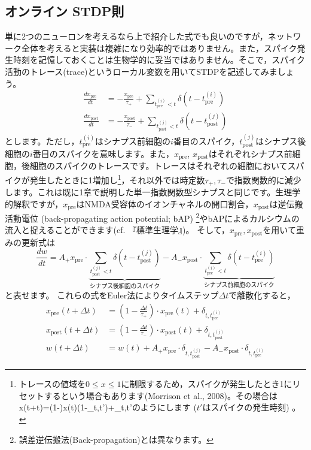 \subsection{オンライン STDP則}
単に2つのニューロンを考えるなら上で紹介した式でも良いのですが，ネットワーク全体を考えると実装は複雑になり効率的ではありません。また，スパイク発生時刻を記憶しておくことは生物学的に妥当ではありません。そこで，スパイク活動のトレース(trace)というローカル変数を用いてSTDPを記述してみましょう。
\begin{align}
\frac{dx_\text{pre}}{dt}&=-\frac{x_\text{pre}}{\tau_+}+\sum_{t_{\text{pre}}^{(i)} <t} \delta \left(t-t_{\text{pre}}^{(i)}\right)\\
\frac{dx_\text{post}}{dt}&=-\frac{x_\text{post}}{\tau_-}+\sum_{t_{\text{post}}^{(j)}<t} \delta \left(t-t_{\text{post}}^{(j)}\right)
\end{align}
とします。ただし，$t_{\text{pre}}^{(i)}$はシナプス前細胞の$i$番目のスパイク，$t_{\text{post}}^{(j)}$はシナプス後細胞の$i$番目のスパイクを意味します。また，$x_\text{pre}$, $x_\text{post}$はそれぞれシナプス前細胞，後細胞のスパイクのトレースです。トレースはそれぞれの細胞においてスパイクが発生したときに1増加し\footnote{トレースの値域を$0\leq x\leq1$に制限するため，スパイクが発生したとき1にリセットするという場合もあります(Morrison et al., 2008)。その場合はx(t+\Delta t)=\left(1-\right)x(t)\cdot(1-\delta_{t,t'})+\delta_{t,t'}のようにします ($t'$はスパイクの発生時刻) 。}，それ以外では時定数$\tau_+, \tau_-$で指数関数的に減少します。これは既に1章で説明した単一指数関数型シナプスと同じです。生理学的解釈ですが，$x_\text{pre}$はNMDA受容体のイオンチャネルの開口割合，$x_\text{post}$は逆伝搬活動電位 (back-propagating action potential; bAP) \footnote{誤差逆伝搬法(Back-propagation)とは異なります。}やbAPによるカルシウムの流入と捉えることができます(cf. 『標準生理学』)。
そして，$x_\text{pre}, x_\text{post}$を用いて重みの更新式は
\begin{equation}
\frac{dw}{dt}=A_+ x_\text{pre} \cdot \underbrace{\sum_{t_{\text{post}}^{(j)}<t} \delta \left(t-t_{\text{post}}^{(j)}\right)}_{\text{シナプス後細胞のスパイク}} - A_- x_{\text{post}} \cdot \underbrace{\sum_{t_{\text{pre}}^{(i)} <t} \delta \left(t-t_{\text{pre}}^{(i)}\right)}_{\text{シナプス前細胞のスパイク}}
\end{equation}
と表せます。
これらの式をEuler法によりタイムステップ$\Delta t$で離散化すると，
\begin{align}
x_{\text{pre}}(t+\Delta t)&=\left(1-\frac{\Delta t}{\tau_{+}}\right)\cdot x_{\text{pre}}(t)+
\delta_{t,t_{\text{pre}}^{(i)}}\\
x_{\text{post}}(t+\Delta t)&=\left(1-\frac{\Delta t}{\tau_{-}}\right)\cdot x_{\text{post}}(t)+\delta_{t,t_{\text{post}}^{(j)}}\\
w(t+\Delta t)&=w(t)+A_+ x_{\text{pre}}\cdot \delta_{t,t_{\text{post}}^{(j)}} - A_-x_{\text{post}}\cdot \delta_{t,t_{\text{pre}}^{(i)}}
\end{align}
